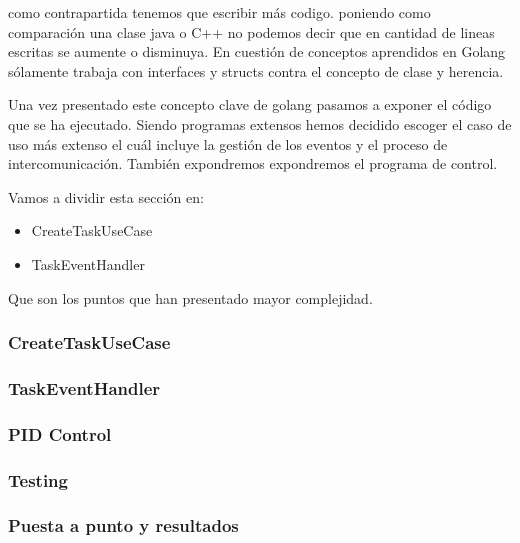como contrapartida tenemos que escribir más codigo. poniendo como comparación una clase java o C++ no podemos decir que en cantidad de lineas escritas se aumente o disminuya. En cuestión de conceptos aprendidos en Golang sólamente trabaja con interfaces y structs contra el concepto de clase y herencia.

Una vez presentado este concepto clave de golang pasamos a exponer el código que se ha ejecutado. Siendo programas extensos hemos decidido escoger el caso de uso más extenso el cuál incluye la gestión de los eventos y el proceso de intercomunicación. También expondremos expondremos el programa de control.

Vamos a dividir esta sección en:
\begin{itemize}
    \item CreateTaskUseCase
    \item TaskEventHandler
\end{itemize}

Que son los puntos que han presentado mayor complejidad.

\subsubsection{CreateTaskUseCase}
    
\subsubsection{TaskEventHandler}
    
\subsubsection{PID Control}\label{subsubsec:pidControl}
    
\subsubsection{Testing}
    
\subsubsection{Puesta a punto y resultados}
    


